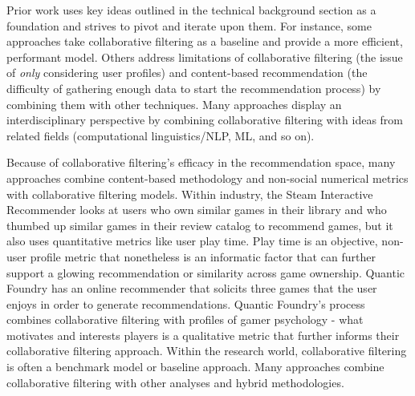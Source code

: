 \documentclass[10pt,twocolumn]{article}
\begin{document}

Prior work uses key ideas outlined in the technical background section as a foundation and strives to pivot and iterate upon them. For instance, some approaches take collaborative filtering as a baseline and provide a more efficient, performant model. Others address limitations of collaborative filtering (the issue of \textit{only} considering user profiles) and content-based recommendation (the difficulty of gathering enough data to start the recommendation process) by combining them with other techniques. Many approaches display an interdisciplinary perspective by combining collaborative filtering with ideas from related fields (computational linguistics/NLP, ML, and so on).

Because of collaborative filtering's efficacy in the recommendation space, many approaches combine content-based methodology and non-social numerical metrics with collaborative filtering models. Within industry, the Steam Interactive Recommender \cite{SteamInteractiveRecommender} looks at users who own similar games in their library and who thumbed up similar games in their review catalog to recommend games, but it also uses quantitative metrics like user play time. Play time is an objective, non-user profile metric that nonetheless is an informatic factor that can further support a glowing recommendation or similarity across game ownership. Quantic Foundry \cite{QuanticFoundryRecommender} has an online recommender that solicits three games that the user enjoys in order to generate recommendations. Quantic Foundry's process combines collaborative filtering with profiles of gamer psychology - what motivates and interests players is a qualitative metric that further informs their collaborative filtering approach. Within the research world, collaborative filtering is often a benchmark model or baseline approach. Many approaches combine collaborative filtering with other analyses and hybrid methodologies. \cite{Choi, Gohari, PerezMarcos}
\end{document}
